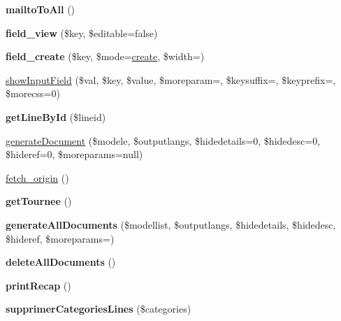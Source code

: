 \begin{DoxyCompactItemize}
{\bfseries mailto\+To\+All} ()
\item 
\mbox{\label{classTourneeGeneric_a514eefa11f6a0ddf31c9f9ff77c3c9a4}} 
{\bfseries field\+\_\+view} (\$key, \$editable=false)
\item 
\mbox{\label{classTourneeGeneric_a88463f78c29cb435d0c4814fbb5390bc}} 
{\bfseries field\+\_\+create} (\$key, \$mode=\textquotesingle{}\hyperlink{classTourneeObject_a9b71233f3654dbf3ed935ecbef106e4a}{create}\textquotesingle{}, \$width=\textquotesingle{}\textquotesingle{})
\item 
\hyperlink{classTourneeGeneric_a756e32cfc9bb433beaba3dfc224603ba}{show\+Input\+Field} (\$val, \$key, \$value, \$moreparam=\textquotesingle{}\textquotesingle{}, \$keysuffix=\textquotesingle{}\textquotesingle{}, \$keyprefix=\textquotesingle{}\textquotesingle{}, \$morecss=0)
\item 
\mbox{\label{classTourneeGeneric_af98a434d793d284c1e29914ba852bd07}} 
{\bfseries get\+Line\+By\+Id} (\$lineid)
\item 
\hyperlink{classTourneeGeneric_aecb57833a3e70efc929500f09368ddd5}{generate\+Document} (\$modele, \$outputlangs, \$hidedetails=0, \$hidedesc=0, \$hideref=0, \$moreparams=null)
\item 
\hyperlink{classTourneeGeneric_a7e7c1ca874ff21c27902d409f1dbf666}{fetch\+\_\+origin} ()
\item 
\mbox{\label{classTourneeGeneric_a9b0680e32be14c22797846d550494bb6}} 
{\bfseries get\+Tournee} ()
\item 
\mbox{\label{classTourneeGeneric_a977d48e795402711f194422d557ae551}} 
{\bfseries generate\+All\+Documents} (\$modellist, \$outputlangs, \$hidedetails, \$hidedesc, \$hideref, \$moreparams=\textquotesingle{}\textquotesingle{})
\item 
\mbox{\label{classTourneeGeneric_a63c97c6846e62328edabae097676f8e1}} 
{\bfseries delete\+All\+Documents} ()
\item 
\mbox{\label{classTourneeGeneric_aefb3505d279b48d85b83c70b17f74030}} 
{\bfseries print\+Recap} ()
\item 
\mbox{\label{classTourneeGeneric_a8e057877d2db261e8b2f430c9982933f}} 
{\bfseries supprimer\+Categories\+Lines} (\$categories)
\end{DoxyCompactItemize}
